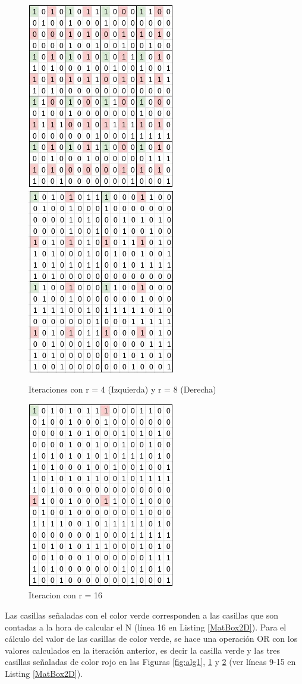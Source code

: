 \begin{figure}[H]
    \centering
    \includegraphics[width=.24\textwidth]{img/ejemploAlgoritmo3.jpeg}
    \includegraphics[width=.24\textwidth]{img/ejemploAlgoritmo4.jpeg}
    \caption{Iteraciones con r = 4 (Izquierda) y r = 8 (Derecha)}
    \label{fig:alg2}
\end{figure}

\begin{figure}[H]
    \centering
    \includegraphics[width=.24\textwidth]{img/ejemploAlgoritmo5.jpeg}
    \caption{Iteracion con r = 16}
    \label{fig:alg3}
\end{figure}


Las casillas señaladas con el color verde corresponden a las casillas que son contadas a la hora de calcular el N (línea 16 en Listing \ref{MatBox2D}). Para el cálculo del valor de las casillas de color verde, se hace una operación OR con los valores calculados en la iteración anterior, es decir la casilla verde y las tres casillas señaladas de color rojo en las Figuras \ref{fig:alg1}, \ref{fig:alg2} y \ref{fig:alg3} (ver líneas 9-15 en Listing \ref{MatBox2D}).